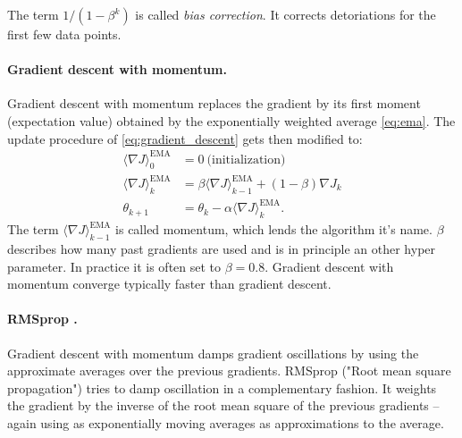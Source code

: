 \documentclass[12pt,a4paper]{article}
\begin{document}
The term $1/\left(1-\beta^k\right)$ is called \textit{bias correction}. It corrects  detoriations for the first few data points.

\paragraph{Gradient descent with momentum.} 
Gradient descent with momentum replaces the gradient by its first moment (expectation value) obtained by the exponentially weighted average \ref{eq:ema}. The update procedure of \ref{eq:gradient_descent} gets then modified to:
\begin{align}
	 \langle  \nabla J \rangle ^{\text{EMA}}_0 &= 0  ~ \text{(initialization)} \\ 
	\langle  \nabla J \rangle ^{\text{EMA}}_k &= \beta \langle  \nabla J \rangle ^{\text{EMA}}_{k-1}+ (1-\beta) \nabla J_k \\
	\theta_{k+1} &= \theta_k - \alpha 	\langle  \nabla J \rangle ^{\text{EMA}}_k. \label{eq:gradient_moments_update}
\end{align}
The term $\langle  \nabla J \rangle ^{\text{EMA}}_{k-1}$ is called momentum, which lends the algorithm it's name.
$\beta$ describes how many past gradients are used and is in principle an other hyper parameter. In practice it is often set to $\beta=0.8$. Gradient descent with momentum converge typically  faster than gradient descent.

\paragraph{RMSprop \cite{Tieleman2012}.} Gradient descent with momentum damps gradient oscillations by using the approximate averages over the previous gradients. RMSprop  ("Root mean square propagation") tries to damp oscillation in a complementary fashion. It weights the gradient by the inverse of the root mean square of the previous gradients  -- again using as exponentially moving averages as approximations to the average. 
\end{document}
